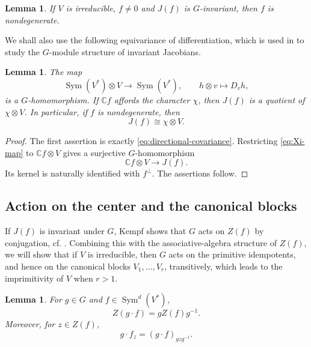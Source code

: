 \documentclass[11pt,reqno]{amsart}
\numberwithin{equation}{section}
\newtheorem{lemma}[theorem]{Lemma}
\theoremstyle{definition}
\theoremstyle{remark}
\newcommand{\C}{\mathbb C}
\newcommand{\Sym}{\operatorname{Sym}}
\begin{document}
\begin{lemma}\label{lem:essential-kernel}
 If $V$ is irreducible, $f\ne0$ and $J(f)$ is $G$-invariant, then $f$ is nondegenerate.
\end{lemma}

 We shall also use the following equivariance of differentiation,
which is used in \cite{Xi} to study the $G$-module structure of
invariant Jacobians.
\begin{lemma}\label{lem:Xi-differentiation}
The map
\begin{equation}\label{eq:Xi-map}
  \Sym(V^*)\otimes V\longrightarrow\Sym(V^*),
  \qquad
  h\otimes v\longmapsto D_vh,
\end{equation}
is a $G$-homomorphism.  If $\C f$ affords the character $\chi$, then
$J(f)$ is a quotient of $\chi\otimes V$. In particular, if $f$ is nondegenerate,
then
\[
  J(f)\cong\chi\otimes V.
\]
\end{lemma}

\begin{proof}
The first assertion is exactly
\eqref{eq:directional-covariance}.  Restricting
\eqref{eq:Xi-map} to $\C f\otimes V$ gives a surjective
$G$-homomorphism
\[
  \C f\otimes V\longrightarrow J(f).
\]
Its kernel is naturally identified with $f^\perp$.  The assertions
follow.
\end{proof}


\subsection{Action on the center and the canonical blocks}


If $J(f)$ is invariant under $G$, Kempf shows that \(G\) acts on \(Z(f)\) by conjugation,  cf. \cite[Lemma~7]{Kempf}. Combining this with the associative-algebra structure of \(Z(f)\), we will show that  if $V$ is irreducible, then $G$ acts on  the primitive idempotents, and hence on the canonical blocks  $V_1,\dots,V_r$, transitively, which leads to the imprimitivity of \(V\) when $r>1$.

\begin{lemma}\label{lem:center-covariance}
For $g\in G$ and $f\in\Sym^d(V^*)$,
\begin{equation}\label{eq:center-covariance}
  Z(g\cdot f)=gZ(f)g^{-1}.
\end{equation}
Moreover, for $z\in Z(f)$,
\begin{equation}\label{eq:fz-covariance}
  g\cdot f_z
  =
  (g\cdot f)_{gzg^{-1}}.
\end{equation}
\end{lemma}
\end{document}
